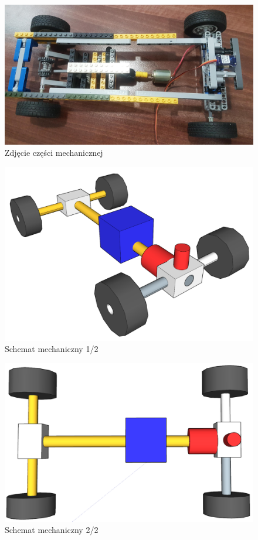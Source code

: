 \documentclass[10pt, a4paper]{article}
\begin{document}
	\begin{figure}[H]
		\centering
		\includegraphics[width=1\textwidth]{figures/20190410_135905.jpg}
		\caption{Zdjęcie części mechanicznej}
		\label{fig:Zdjęcie części mechanicznej}
	\end{figure}
	
		\begin{figure}[H]
		\centering
		\includegraphics[width=1\textwidth]{figures/1.png}
		\caption{Schemat mechaniczny 1/2}
		\label{fig:Schemat mechaniczny 1}
	\end{figure}
	
		\begin{figure}[H]
		\centering
		\includegraphics[width=1\textwidth]{figures/2.png}
		\caption{Schemat mechaniczny 2/2}
		\label{fig:Schemat mechaniczny 2}
	\end{figure}
	
\end{document}
